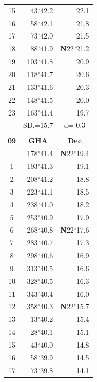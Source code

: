\documentclass[10pt, a4paper]{report}
\begin{document}
\begin{scriptsize}
\begin{tabular*}{0.2\textwidth}[t]{@{\extracolsep{\fill}}|c|rr|}
15 & 43$^\circ$42.2 & \raisebox{0.24ex}{\boldmath$\cdot$~\boldmath$\cdot$~~}22.1\\
16 & 58$^\circ$42.1 & 21.8\\
17 & 73$^\circ$42.0 & 21.5\\[2Pt]
18 & 88$^\circ$41.9 & \textbf{N}22$^\circ$21.2\\
19 & 103$^\circ$41.8 & 20.9\\
20 & 118$^\circ$41.7 & 20.6\\
21 & 133$^\circ$41.6 & \raisebox{0.24ex}{\boldmath$\cdot$~\boldmath$\cdot$~~}20.3\\
22 & 148$^\circ$41.5 & 20.0\\
23 & 163$^\circ$41.4 & 19.7\\
\hline
\rule{0pt}{2.4ex} & \multicolumn{1}{c}{SD.=15.7} & \multicolumn{1}{c|}{d=-0.3}\\
\hline
\multicolumn{1}{c}{}\\[-0.5ex]\hline
\multicolumn{1}{|c|}{\rule{0pt}{2.6ex}\textbf{09}} & \multicolumn{1}{c}{\textbf{GHA}} & \multicolumn{1}{c|}{\textbf{Dec}}\\
\hline\rule{0pt}{2.6ex}\noindent
0 & 178$^\circ$41.4 & \textbf{N}22$^\circ$19.4\\
1 & 193$^\circ$41.3 & 19.1\\
2 & 208$^\circ$41.2 & 18.8\\
3 & 223$^\circ$41.1 & \raisebox{0.24ex}{\boldmath$\cdot$~\boldmath$\cdot$~~}18.5\\
4 & 238$^\circ$41.0 & 18.2\\
5 & 253$^\circ$40.9 & 17.9\\[2Pt]
6 & 268$^\circ$40.8 & \textbf{N}22$^\circ$17.6\\
7 & 283$^\circ$40.7 & 17.3\\
8 & 298$^\circ$40.6 & 16.9\\
9 & 313$^\circ$40.5 & \raisebox{0.24ex}{\boldmath$\cdot$~\boldmath$\cdot$~~}16.6\\
10 & 328$^\circ$40.5 & 16.3\\
11 & 343$^\circ$40.4 & 16.0\\[2Pt]
12 & 358$^\circ$40.3 & \textbf{N}22$^\circ$15.7\\
13 & 13$^\circ$40.2 & 15.4\\
14 & 28$^\circ$40.1 & 15.1\\
15 & 43$^\circ$40.0 & \raisebox{0.24ex}{\boldmath$\cdot$~\boldmath$\cdot$~~}14.8\\
16 & 58$^\circ$39.9 & 14.5\\
17 & 73$^\circ$39.8 & 14.1\\[2Pt]

\end{tabular*}
\end{scriptsize}
\end{document}
